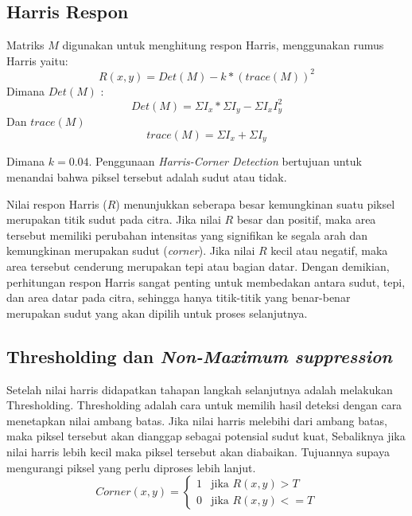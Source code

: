 \subsection{Harris Respon}
    Matriks \(M\) digunakan untuk menghitung respon Harris, menggunakan rumus Harris yaitu:
\begin{equation}
    R(x,y) = Det(M) - k * (trace(M))^2
\end{equation}
Dimana \(Det(M)\) :
\begin{equation*}
    Det(M) = \Sigma I_{x} * \Sigma I_{y} - \Sigma I_{x}I_{y}^2
\end{equation*}
Dan \(trace(M)\) 
\begin{equation*}
    trace(M) = \Sigma I_{x} + \Sigma I_{y}
\end{equation*}

    Dimana \(k = 0.04\). Penggunaan \emph{Harris-Corner Detection} bertujuan untuk menandai bahwa piksel tersebut adalah sudut atau tidak.

    Nilai respon Harris (\(R\)) menunjukkan seberapa besar kemungkinan suatu piksel merupakan titik sudut pada citra. Jika nilai \(R\) besar dan positif, maka area tersebut memiliki perubahan intensitas yang signifikan ke segala arah dan kemungkinan merupakan sudut (\emph{corner}). Jika nilai \(R\) kecil atau negatif, maka area tersebut cenderung merupakan tepi atau bagian datar. Dengan demikian, perhitungan respon Harris sangat penting untuk membedakan antara sudut, tepi, dan area datar pada citra, sehingga hanya titik-titik yang benar-benar merupakan sudut yang akan dipilih untuk proses selanjutnya.

\subsection{Thresholding dan \emph{Non-Maximum suppression}}
    Setelah nilai harris didapatkan tahapan langkah selanjutnya adalah melakukan Thresholding.
Thresholding adalah cara untuk memilih hasil deteksi dengan cara menetapkan nilai ambang batas.
Jika nilai harris melebihi dari ambang batas, maka piksel tersebut akan dianggap sebagai potensial sudut kuat, Sebaliknya jika nilai harris lebih kecil maka piksel tersebut akan diabaikan.
Tujuannya supaya mengurangi piksel yang perlu diproses lebih lanjut.
\begin{equation}
    Corner(x,y) = 
    \begin{cases}  
        1 & \text{jika } R(x,y) > T \\ 
        0 & \text{jika } R(x,y) <= T
    \end{cases}
\end{equation}


